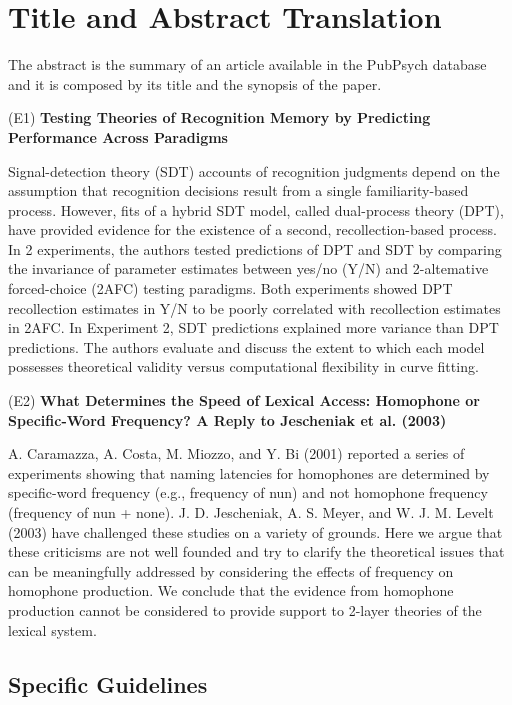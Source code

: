 \documentclass[a4paper,10pt]{article}
\newcommand{\exTit}[1]{\begin{tcolorbox}[enhanced,attach boxed title to top center={yshift=-3mm,yshifttext=-1mm},title=Examples,coltitle=black,colbacktitle=white]{#1}\end{tcolorbox}}
\begin{document}
\section{Title and Abstract Translation}
\label{s:abstracts}


The abstract is the summary of an article available in the PubPsych database and it is composed by its title and the synopsis of the paper. 

\medskip
\exTit{
(E1) {\bf Testing Theories of Recognition Memory by Predicting Performance Across Paradigms} \par
\medskip
Signal-detection theory (SDT) accounts of recognition judgments depend on the assumption that recognition decisions result from a single familiarity-based process. However, fits of a hybrid SDT model, called dual-process theory (DPT), have provided evidence for the existence of a second, recollection-based process. In 2 experiments, the authors tested predictions of DPT and SDT by comparing the invariance of parameter estimates between yes/no (Y/N) and 2-altemative forced-choice (2AFC) testing paradigms. Both experiments showed DPT recollection estimates in Y/N to be poorly correlated with recollection estimates in 2AFC. In Experiment 2, SDT predictions explained more variance than DPT predictions. The authors evaluate and discuss the extent to which each model possesses theoretical validity versus computational flexibility in curve fitting.

\bigskip
(E2) {\bf What Determines the Speed of Lexical Access: Homophone or Specific-Word Frequency? A Reply to Jescheniak et al. (2003)} \par
\medskip
A. Caramazza, A. Costa, M. Miozzo, and Y. Bi (2001) reported a series of experiments showing that naming latencies for homophones are determined by specific-word frequency (e.g., frequency of nun) and not homophone frequency (frequency of nun + none). J. D. Jescheniak, A. S. Meyer, and W. J. M. Levelt (2003) have challenged these studies on a variety of grounds. Here we argue that these criticisms are not well founded and try to clarify the theoretical issues that can be meaningfully addressed by considering the effects of frequency on homophone production. We conclude that the evidence from homophone production cannot be considered to provide support to 2-layer theories of the lexical system.
}


\subsection{Specific Guidelines}
\label{ss:a_guidelines}
\end{document}
